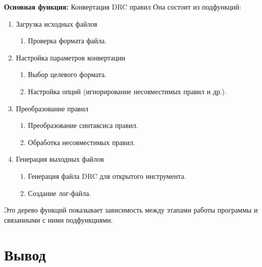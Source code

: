 \textbf{Основная функция:} Конвертация DRC правил
Она состоит из подфункций:
\begin{enumerate}
	\item Загрузка исходных файлов
	\begin{enumerate}
		\item Проверка формата файла.
	\end{enumerate}
	\item Настройка параметров конвертации
	\begin{enumerate}
		\item Выбор целевого формата.
		\item Настройка опций (игнорирование несовместимых правил и др.).
	\end{enumerate}
	\item Преобразование правил
	\begin{enumerate}
		\item Преобразование синтаксиса правил.
		\item Обработка несовместимых правил.
	\end{enumerate}
	\item Генерация выходных файлов
	\begin{enumerate}
		\item Генерация файла DRC для открытого инструмента.
		\item Создание лог-файла.
	\end{enumerate}
\end{enumerate}

Это дерево функций показывает зависимость между этапами работы программы
и связанными с ними подфункциями.

\clearpage

\section*{\LARGE Вывод}


